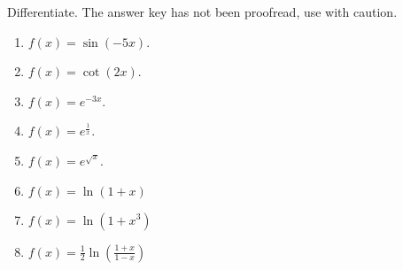 Differentiate. The answer key has not been proofread, use with caution.
\begin{multicols}{3}
\begin{enumerate}[ref={\fcProblemRef}]
\item $\displaystyle f(x)=\sin (-5x)$. 

\item $\displaystyle f(x)=\cot (2x)$. 

\item $\displaystyle f(x)=e^{-3x}$. 

\item $\displaystyle f(x)=e^{\frac{1}x}$. 

\item $\displaystyle f(x)=e^{\sqrt{x}}$. 

\item $\displaystyle f(x)=\ln (1+x) $

\item $\displaystyle f(x)=\ln(1+x^3) $

\item $\displaystyle f(x)=\frac{1}{2}\ln\left(\frac{1+x}{1-x}\right) $

\end{enumerate}
\end{multicols}
